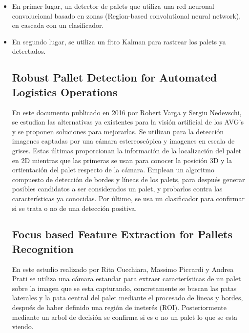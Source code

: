 \begin{itemize}
\item En primer lugar, un detector de palets que utiliza una red neuronal convolucional basado en zonas (Region-based convolutional neural network), en cascada con un clasificador.
\item En segundo lugar, se utiliza un fltro Kalman para rastrear los palets ya detectados.

\subsection{Robust Pallet Detection for Automated Logistics Operations}
En este documento publicado en 2016 por Robert Varga y Sergiu Nedevschi, se estudian las alternativas ya existentes para la visión artificial de los AVG's y se proponen soluciones para mejorarlas.
Se utilizan para la detección imagenes captadas por una cámara estereoscópica y imagenes en escala de grises. Estas últimas proporcionan la información de la localización del palet en 2D mientras que las primeras se usan para conocer la posición 3D y la ortientación del palet respecto de la cámara.
Emplean un algoritmo compuesto de detección de bordes y líneas de los palets, para después generar posibles candidatos a ser considerados un palet, y probarlos contra las características ya conocidas. Por último, se usa un clasificador para confirmar si se trata o no de una detección positiva.

\subsection{Focus based Feature Extraction for Pallets Recognition}
En este estudio realizado por Rita Cucchiara, Massimo Piccardi y Andrea Prati se utiliza una cámara estandar para extraer características de un palet sobre la imagen que se esta capturando, concretamente se buscan las patas laterales y la pata central del palet mediante el procesado de líneas y bordes, después de haber definido una región de ineterés (ROI). Posteriormente mediante un arbol de decisión se confirma si es o no un palet lo que se esta viendo.


\end{itemize}
